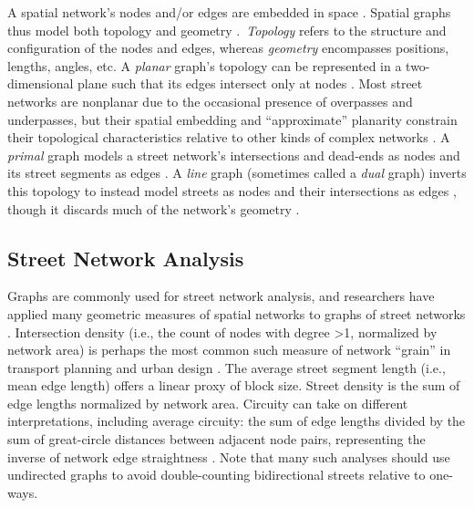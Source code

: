 \documentclass[12pt,letterpaper]{article} %
\begin{document}
A spatial network's nodes and/or edges are embedded in space \citep{barthelemy_spatial_2022}. Spatial graphs thus model both topology and geometry \citep{fischer_spatial_2014}.\ \textit{Topology} refers to the structure and configuration of the nodes and edges, whereas \textit{geometry} encompasses positions, lengths, angles, etc. A \textit{planar} graph's topology can be represented in a two-dimensional plane such that its edges intersect only at nodes \citep{barthelemy_modeling_2008}. Most street networks are nonplanar due to the occasional presence of overpasses and underpasses, but their spatial embedding and \enquote{approximate} planarity constrain their topological characteristics relative to other kinds of complex networks \citep{boeing_planarity_2020}. A \textit{primal} graph models a street network's intersections and dead-ends as nodes and its street segments as edges \citep{porta_network_2006-1}. A \textit{line} graph (sometimes called a \textit{dual} graph) inverts this topology to instead model streets as nodes and their intersections as edges \citep{porta_network_2006}, though it discards much of the network's geometry \citep{ratti_space_2004}.

\subsection{Street Network Analysis}

Graphs are commonly used for street network analysis, and researchers have applied many geometric measures of spatial networks to graphs of street networks \citep{barthelemy_spatial_2011}. Intersection density (i.e., the count of nodes with degree >1, normalized by network area) is perhaps the most common such measure of network \enquote{grain} in transport planning and urban design \citep[e.g.,][]{ewing_travel_2010}. The average street segment length (i.e., mean edge length) offers a linear proxy of block size. Street density is the sum of edge lengths normalized by network area. Circuity can take on different interpretations, including average circuity: the sum of edge lengths divided by the sum of great-circle distances between adjacent node pairs, representing the inverse of network edge straightness \citep{boeing_urban_2019}. Note that many such analyses should use undirected graphs to avoid double-counting bidirectional streets relative to one-ways.
\end{document}
